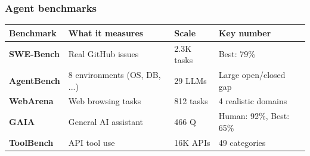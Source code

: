 \documentclass[aspectratio=169]{beamer}
\begin{document}
\begin{frame}
\frametitle{Agent benchmarks}
\vspace{-0.2cm}
\renewcommand{\arraystretch}{1.3}
\begin{center}
{\small
\begin{tabular}{>{\bfseries}l l l l}
\hline
\textbf{Benchmark} & \textbf{What it measures} & \textbf{Scale} & \textbf{Key number} \\
\hline
SWE-Bench & Real GitHub issues & 2.3K tasks & Best: 79\% \\
AgentBench & 8 environments (OS, DB, ...) & 29 LLMs & Large open/closed gap \\
WebArena & Web browsing tasks & 812 tasks & 4 realistic domains \\
GAIA & General AI assistant & 466 Q & Human: 92\%, Best: 65\% \\
ToolBench & API tool use & 16K APIs & 49 categories \\
\hline
\end{tabular}
}
\end{center}

\vspace{0.3cm}
\begin{center}
\end{center}
\end{frame}
\end{document}
